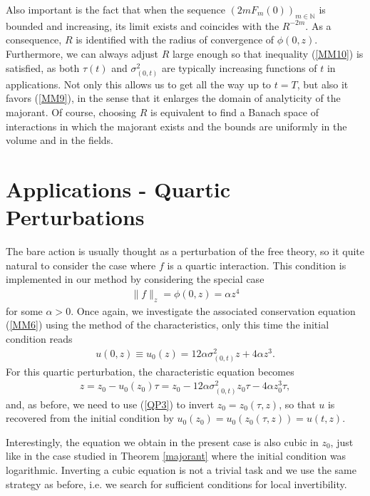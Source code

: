 \documentclass[12pt,twoside]{amsart}
\numberwithin{equation}{section}
\begin{document}
Also important is the fact that when the sequence $(2m F_{m}(0))_{m \in \mathbb{N}}$ is bounded and increasing, its limit exists and coincides with the $R^{-2m}$. As a consequence, $R$ is identified with the radius of convergence of $\phi(0,z)$. Furthermore, we can always adjust $R$ large enough so that inequality (\ref{MM10}) is satisfied, as both $\tau(t)$ and $\sigma_{(0,t)}^{2}$ are typically increasing functions of $t$ in applications. Not only this allows us to get all the way up to $t = T$, but also it favors (\ref{MM9}), in the sense that it enlarges the domain of analyticity of the majorant. Of course, choosing $R$ is equivalent to find a Banach space of interactions in which the majorant exists and the bounds are uniformly in the volume and in the fields. 



\section{Applications - Quartic Perturbations}\label{quarticapplications}

The bare action is usually thought as a perturbation of the free theory, so it quite natural to consider the case where $f$ is a quartic interaction. This condition is implemented in our method by considering the special case
\begin{eqnarray}
\|f\|_{z} = \phi(0,z) = \alpha z^{4} \label{QP1}
\end{eqnarray}
for some $\alpha > 0$. Once again, we investigate the associated conservation equation (\ref{MM6}) using the method of the characteristics, only this time the initial condition reads
\begin{eqnarray}
u(0,z) \equiv u_{0}(z) = 12\alpha \sigma_{(0,t)}^{2}z + 4\alpha z^{3}. \label{QP2} 
\end{eqnarray}
For this quartic perturbation, the characteristic equation becomes
\begin{eqnarray}
z = z_{0}-u_{0}(z_{0})\tau = z_{0} - 12\alpha \sigma_{(0,t)}^{2}z_{0}\tau - 4\alpha z_{0}^{3}\tau, \label{QP3}
\end{eqnarray}
and, as before, we need to use (\ref{QP3}) to invert $z_{0} = z_{0}(\tau,z)$, so that $u$ is recovered from the initial condition by $u_{0}(z_{0}) = u_{0}(z_{0}(\tau,z)) = u(t,z)$. 


Interestingly, the equation we obtain in the present case is also cubic in $z_{0}$, just like in the case studied in Theorem \ref{majorant} where the initial condition was logarithmic. Inverting a cubic equation is not a trivial task and we use the same strategy as before, i.e. we search for sufficient conditions for local invertibility.  
\end{document}
